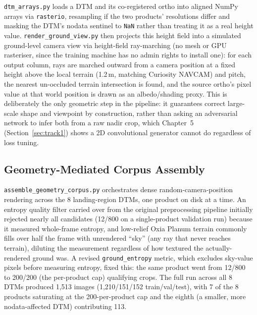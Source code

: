 \texttt{dtm\_arrays.py} loads a DTM and its co-registered ortho into aligned NumPy arrays via \texttt{rasterio}, resampling if the two products' resolutions differ and masking the DTM's nodata sentinel to \texttt{NaN} rather than treating it as a real height value. \texttt{render\_ground\_view.py} then projects this height field into a simulated ground-level camera view via height-field ray-marching (no mesh or GPU rasteriser, since the training machine has no admin rights to install one): for each output column, rays are marched outward from a camera position at a fixed height above the local terrain (1.2\,m, matching Curiosity NAVCAM) and pitch, the nearest un-occluded terrain intersection is found, and the source ortho's pixel value at that world position is drawn as an albedo/shading proxy. This is deliberately the only geometric step in the pipeline: it guarantees correct large-scale shape and viewpoint by construction, rather than asking an adversarial network to infer both from a raw nadir crop, which Chapter~5 (Section~\ref{sec:track1}) shows a 2D convolutional generator cannot do regardless of loss tuning.

\subsection{Geometry-Mediated Corpus Assembly}
\label{sec:geocorpus-impl}

\texttt{assemble\_geometry\_corpus.py} orchestrates dense random-camera-position rendering across the 8 landing-region DTMs, one product on disk at a time. An entropy quality filter carried over from the original preprocessing pipeline initially rejected nearly all candidates (12/800 on a single-product validation run) because it measured whole-frame entropy, and low-relief Oxia Planum terrain commonly fills over half the frame with unrendered ``sky'' (any ray that never reaches terrain), diluting the measurement regardless of how textured the actually-rendered ground was. A revised \texttt{ground\_entropy} metric, which excludes sky-value pixels before measuring entropy, fixed this: the same product went from 12/800 to 200/200 (the per-product cap) qualifying crops. The full run across all 8 DTMs produced 1{,}513 images (1{,}210/151/152 train/val/test), with 7 of the 8 products saturating at the 200-per-product cap and the eighth (a smaller, more nodata-affected DTM) contributing 113.

